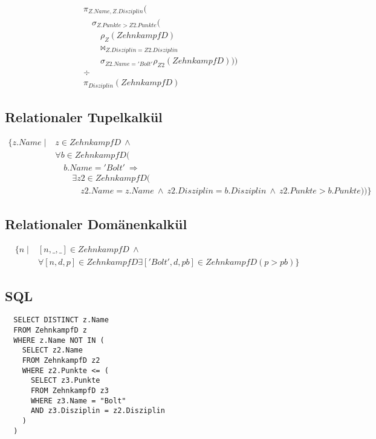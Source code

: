 \documentclass[10pt,a4paper]{article}
\begin{document}
\begin{align*}
  & \pi_{Z.Name, Z.Disziplin}(\\
  & \quad \sigma_{Z.Punkte > Z2.Punkte}(\\
  & \quad \quad \rho_{Z}(ZehnkampfD)\\
  & \quad \quad \bowtie_{Z.Disziplin = Z2.Disziplin}\\
  & \quad \quad \sigma_{Z2.Name = 'Bolt'}\rho_{Z2}(ZehnkampfD)))\\
  & \div\\
  & \pi_{Disziplin}(ZehnkampfD)
\end{align*}

\subsection*{Relationaler Tupelkalkül}

\begin{align*}
  \{ z.Name \mid & z \in ZehnkampfD\ \land\\
                 & \forall b \in ZehnkampfD(\\
                 & \quad b.Name = 'Bolt'\ \Rightarrow\\
                 & \quad \quad \exists z2 \in ZehnkampfD (\\
                 & \quad \quad \quad z2.Name = z.Name\ \land\ z2.Disziplin = b.Disziplin\ \land\ z2.Punkte > b.Punkte)) \}
\end{align*}

\subsection*{Relationaler Domänenkalkül}

\begin{align*}
  \{ n \mid & [n, \_, \_] \in ZehnkampfD\ \land\\
            & \forall [n, d, p] \in ZehnkampfD \exists ['Bolt', d, pb] \in ZehnkampfD (p > pb) \}
\end{align*}

\subsection*{SQL}

\begin{verbatim}
  SELECT DISTINCT z.Name
  FROM ZehnkampfD z
  WHERE z.Name NOT IN (
    SELECT z2.Name
    FROM ZehnkampfD z2
    WHERE z2.Punkte <= (
      SELECT z3.Punkte
      FROM ZehnkampfD z3
      WHERE z3.Name = "Bolt"
      AND z3.Disziplin = z2.Disziplin
    )
  )
\end{verbatim}
\end{document}
